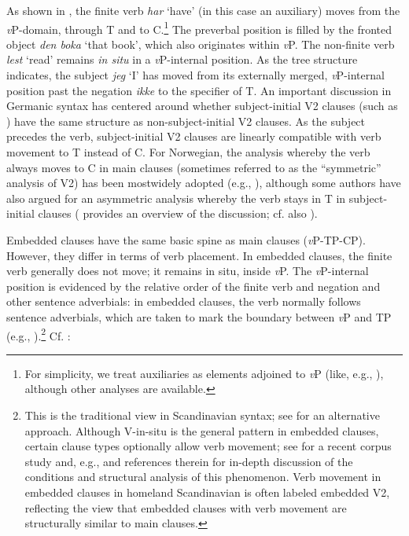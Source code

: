 \documentclass[output=paper,colorlinks,citecolor=brown]{langscibook}
\begin{document}
\noindent As shown in , the finite verb \emph{har} `have' (in this case an auxiliary) moves from the \emph{v}P-domain, through T and to C.\footnote{For simplicity, we treat auxiliaries as elements adjoined to \emph{v}P (like, e.g., \citealt{faarlund2019syntax}), although other analyses are available.} The preverbal position is filled by the fronted object \emph{den boka} `that book', which also originates within \emph{v}P.   The non-finite verb \emph{lest} `read' remains \emph{in situ} in a \emph{v}P-internal position. As the tree structure indicates, the subject \emph{jeg} `I' has moved from its externally merged, \emph{v}P-internal position past the negation \emph{ikke} to the specifier of T. An important discussion in Germanic syntax has centered around whether subject-initial V2 clauses (such as ) have the same structure as non-subject-initial V2 clauses. As the subject precedes the verb, subject-initial V2 clauses are linearly compatible with verb movement to T instead of C. For Norwegian, the analysis whereby the verb always moves to C in main clauses (sometimes referred to as the ``symmetric'' analysis of V2) has  been mostwidely adopted (e.g., \citealt{faarlund2019syntax}), although some authors have also argued for an asymmetric analysis whereby the verb stays in T in subject-initial clauses (\citealt{holmberg2015V2} provides an overview of the  discussion; cf. also ). 





Embedded clauses have the same basic spine as main clauses (\emph{v}P-TP-CP). However, they differ in terms of verb placement. In embedded clauses, the finite verb generally does not  move;  it remains in situ, inside \emph{v}P. The \emph{v}P-internal position is evidenced by the relative order of the finite verb and negation and other sentence adverbials: in embedded clauses, the verb normally  follows sentence adverbials, which are taken to mark the boundary between \emph{v}P and TP (e.g., \citealt{platzack2011fantastiska}).\footnote{This is the traditional view in Scandinavian syntax; see \citet{wiklundetal2009rethinking} for an alternative approach. Although  V-in-situ is the general pattern in embedded clauses, certain clause types optionally allow verb movement; see \citet{ringstad2019embedded} for a recent corpus study and, e.g., \citet{julien2015force} and references therein for in-depth discussion of the conditions and structural analysis of this phenomenon. Verb movement in embedded clauses in homeland Scandinavian is often labeled embedded V2, reflecting the view that embedded clauses with verb movement are structurally similar to main clauses.}
 Cf. :
\end{document}
